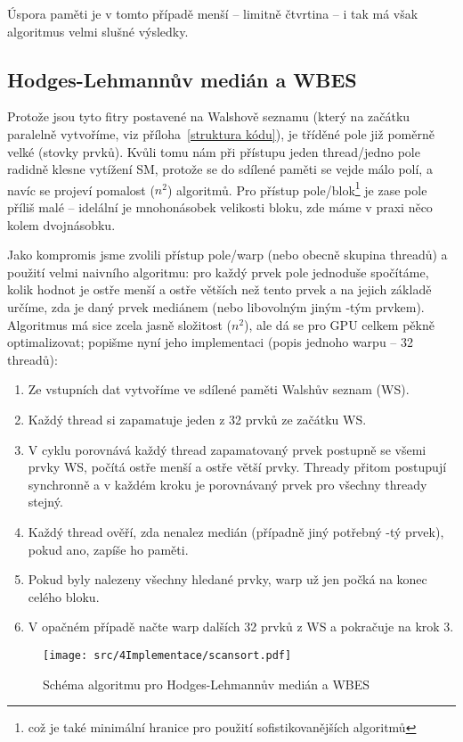         Úspora paměti je v tomto případě menší -- limitně čtvrtina -- i tak má však algoritmus velmi slušné výsledky.

    \subsection{Hodges-Lehmannův medián a WBES}

    Protože jsou tyto fitry postavené na Walshově seznamu (který na začátku paralelně vytvoříme, viz příloha~\ref{struktura kódu}), je tříděné pole již poměrně velké (stovky prvků). Kvůli tomu nám při přístupu jeden thread/jedno pole radidně klesne vytížení SM, protože se do sdílené paměti se vejde málo polí, a navíc se projeví pomalost \OOO($n^2$) algoritmů. Pro přístup pole/blok\footnote{což je také minimální hranice pro použití sofistikovanějších algoritmů} je zase pole příliš malé -- idelální je mnohonásobek velikosti bloku, zde máme v praxi něco kolem dvojnásobku.

    Jako kompromis jsme zvolili přístup pole/warp (nebo obecně skupina threadů) a použití velmi naivního algoritmu: pro každý prvek pole jednoduše spočítáme, kolik hodnot je ostře menší a ostře větších než tento prvek a na jejich základě určíme, zda je daný prvek mediánem (nebo libovolným jiným \kk-tým prvkem). Algoritmus má sice zcela jasně složitost \OOO($n^2$), ale dá se pro GPU celkem pěkně optimalizovat; popišme nyní jeho implementaci (popis jednoho warpu -- 32 threadů):
    \begin{enumerate}
      \item Ze vstupních dat vytvoříme ve sdílené paměti Walshův seznam (WS).
      \item Každý thread si zapamatuje jeden z 32 prvků ze začátku WS.
      \item V cyklu porovnává každý thread zapamatovaný prvek postupně se všemi prvky WS, počítá ostře menší a ostře větší prvky. Thready přitom postupují synchronně a v každém kroku je porovnávaný prvek pro všechny thready stejný.
      \item Každý thread ověří, zda nenalez medián (případně jiný potřebný \kk-tý prvek), pokud ano, zapíše ho paměti.
      \item Pokud byly nalezeny všechny hledané prvky, warp už jen počká na konec celého bloku.
      \item V opačném případě načte warp dalších 32 prvků z WS a pokračuje na krok 3.
    \end{enumerate}
    \begin{figure}[h]
    \begin{center}
      \texttt{[image: src/4Implementace/scansort.pdf]}
      \caption{Schéma algoritmu pro Hodges-Lehmannův medián a WBES}
    \end{center}
    \end{figure}

